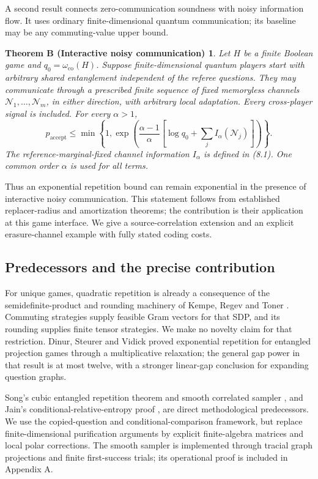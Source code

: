 \documentclass[11pt,reqno]{amsart}
\newtheorem*{theoremB}{Theorem B (Interactive noisy communication)}
\numberwithin{equation}{section}
\begin{document}
A second result connects zero-communication soundness with noisy information flow. It uses ordinary finite-dimensional quantum communication; its baseline may be any commuting-value upper bound.

\begin{theoremB}
Let \(H\) be a finite Boolean game and \(q_0=\omega_{\mathrm{co}}(H)\). Suppose finite-dimensional quantum players start with arbitrary shared entanglement independent of the referee questions. They may communicate through a prescribed finite sequence of fixed memoryless channels \(\mathcal N_1,\ldots,\mathcal N_m\), in either direction, with arbitrary local adaptation. Every cross-player signal is included. For every \(\alpha>1\),
\[
 p_{\mathrm{accept}}\le
 \min\left\{1,\exp\left(\frac{\alpha-1}{\alpha}
 [\log q_0+\sum_j I_\alpha(\mathcal N_j)]\right)\right\}. \tag{B}
\]
The reference-marginal-fixed channel information \(I_\alpha\) is defined in (8.1). One common order \(\alpha\) is used for all terms.
\end{theoremB}

Thus an exponential repetition bound can remain exponential in the presence of interactive noisy communication. This statement follows from established replacer-radius and amortization theorems; the contribution is their application at this game interface. We give a source-correlation extension and an explicit erasure-channel example with fully stated coding costs.

\subsection{Predecessors and the precise contribution}\label{predecessors-and-the-precise-contribution}

For unique games, quadratic repetition is already a consequence of the semidefinite-product and rounding machinery of Kempe, Regev and Toner \cite[SDP 3, Lemma 5.7, Theorems 5.2 and 5.5]{KRT}. Commuting strategies supply feasible Gram vectors for that SDP, and its rounding supplies finite tensor strategies. We make no novelty claim for that restriction. Dinur, Steurer and Vidick \cite[Theorem 1, version 2]{DSV} proved exponential repetition for entangled projection games through a multiplicative relaxation; the general gap power in that result is at most twelve, with a stronger linear-gap conclusion for expanding question graphs.

Song's cubic entangled repetition theorem and smooth correlated sampler \cite[Lemma 4.1]{Song}, and Jain's conditional-relative-entropy proof \cite[Definitions 2.6, 2.8; Lemmas 2.24--2.25 and 4.1--4.2]{Jain}, are direct methodological predecessors. We use the copied-question and conditional-comparison framework, but replace finite-dimensional purification arguments by explicit finite-algebra matrices and local polar corrections. The smooth sampler is implemented through tracial graph projections and finite first-success trials; its operational proof is included in Appendix A.
\end{document}
